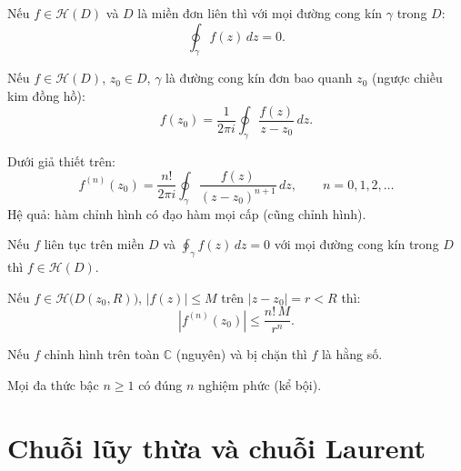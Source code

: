 \documentclass[12pt,a4paper]{article}
\begin{document}
\begin{dinhly}[title={Định lý Cauchy}]
  Nếu $f \in \mathcal{H}(D)$ và $D$ là miền đơn liên thì với mọi đường cong kín $\gamma$ trong $D$:
  \[
    \oint_\gamma f(z)\,dz = 0.
  \]
\end{dinhly}

\begin{dinhly}[title={Công thức tích phân Cauchy}]
  Nếu $f \in \mathcal{H}(D)$, $z_0 \in D$, $\gamma$ là đường cong kín đơn bao quanh $z_0$ (ngược chiều kim đồng hồ):
  \[
    f(z_0) = \frac{1}{2\pi i}\oint_\gamma \frac{f(z)}{z - z_0}\,dz.
  \]
\end{dinhly}

\begin{dinhly}[title={Công thức đạo hàm Cauchy}]
  Dưới giả thiết trên:
  \[
    f^{(n)}(z_0) = \frac{n!}{2\pi i}\oint_\gamma \frac{f(z)}{(z - z_0)^{n+1}}\,dz, \qquad n = 0, 1, 2, \ldots
  \]
  Hệ quả: hàm chỉnh hình có đạo hàm mọi cấp (cũng chỉnh hình).
\end{dinhly}

\begin{dinhly}[title={Định lý Morera}]
  Nếu $f$ liên tục trên miền $D$ và $\displaystyle\oint_\gamma f(z)\,dz = 0$ với mọi đường cong kín trong $D$ thì $f \in \mathcal{H}(D)$.
\end{dinhly}

\begin{dinhly}[title={Bất đẳng thức Cauchy}]
  Nếu $f \in \mathcal{H}\bigl(D(z_0, R)\bigr)$, $|f(z)| \le M$ trên $|z - z_0| = r < R$ thì:
  \[
    |f^{(n)}(z_0)| \le \frac{n!\,M}{r^n}.
  \]
\end{dinhly}

\begin{dinhly}[title={Định lý Liouville}]
  Nếu $f$ chỉnh hình trên toàn $\mathbb{C}$ (nguyên) và bị chặn thì $f$ là hằng số.
\end{dinhly}

\begin{dinhly}[title={Định lý cơ bản của đại số (hệ quả)}]
  Mọi đa thức bậc $n \ge 1$ có đúng $n$ nghiệm phức (kể bội).
\end{dinhly}

\section{Chuỗi lũy thừa và chuỗi Laurent}
\end{document}
